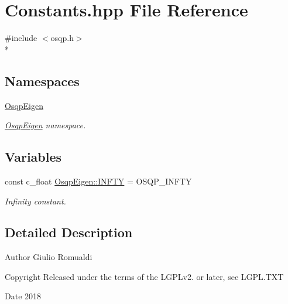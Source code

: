\section{Constants.\+hpp File Reference}
\label{Constants_8hpp}
{\ttfamily \#include $<$osqp.\+h$>$}\\*
\subsection*{Namespaces}
\begin{DoxyCompactItemize}
\item 
 \hyperlink{namespaceOsqpEigen}{Osqp\+Eigen}
\begin{DoxyCompactList}\small\item\em \hyperlink{namespaceOsqpEigen}{Osqp\+Eigen} namespace. \end{DoxyCompactList}\end{DoxyCompactItemize}
\subsection*{Variables}
\begin{DoxyCompactItemize}
\item 
const c\+\_\+float \hyperlink{namespaceOsqpEigen_acfe9d2ea05e99677c0dc9e8f5646098d}{Osqp\+Eigen\+::\+I\+N\+F\+TY} = O\+S\+Q\+P\+\_\+\+I\+N\+F\+TY
\begin{DoxyCompactList}\small\item\em Infinity constant. \end{DoxyCompactList}\end{DoxyCompactItemize}


\subsection{Detailed Description}
\begin{DoxyAuthor}{Author}
Giulio Romualdi 
\end{DoxyAuthor}
\begin{DoxyCopyright}{Copyright}
Released under the terms of the L\+G\+P\+Lv2. or later, see L\+G\+P\+L.\+T\+XT 
\end{DoxyCopyright}
\begin{DoxyDate}{Date}
2018 
\end{DoxyDate}
